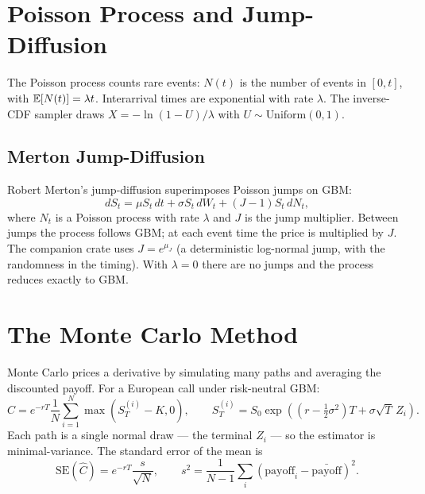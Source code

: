 \section{Poisson Process and Jump-Diffusion}


The Poisson process counts rare events: $N(t)$ is the number of events in
$[0, t]$, with $\mathbb{E}[N(t)] = \lambda t$. Interarrival times are exponential
with rate $\lambda$. The inverse-CDF sampler draws
$X = -\ln(1 - U) / \lambda$ with $U \sim \text{Uniform}(0, 1)$.

\subsection{Merton Jump-Diffusion}


Robert Merton's jump-diffusion superimposes Poisson jumps on GBM:
\[
dS_t = \mu S_t \, dt + \sigma S_t \, dW_t + (J - 1) S_t \, dN_t,
\]
where $N_t$ is a Poisson process with rate $\lambda$ and $J$ is the jump
multiplier. Between jumps the process follows GBM; at each event time the
price is multiplied by $J$. The companion crate uses $J = e^{\mu_J}$ (a
deterministic log-normal jump, with the randomness in the timing). With
$\lambda = 0$ there are no jumps and the process reduces exactly to GBM.

\section{The Monte Carlo Method}


Monte Carlo prices a derivative by simulating many paths and averaging the
discounted payoff. For a European call under risk-neutral GBM:
\[
\hat{C} = e^{-rT} \frac{1}{N} \sum_{i=1}^N \max(S_T^{(i)} - K, 0),
\qquad
S_T^{(i)} = S_0 \exp\!\left( \left(r - \tfrac{1}{2}\sigma^2\right) T + \sigma \sqrt{T} \, Z_i \right).
\]
Each path is a single normal draw --- the terminal $Z_i$ --- so the estimator
is minimal-variance. The standard error of the mean is
\[
\text{SE}(\hat{C}) = e^{-rT} \frac{s}{\sqrt{N}}, \qquad
s^2 = \frac{1}{N-1} \sum_i (\text{payoff}_i - \bar{\text{payoff}})^2.
\]

